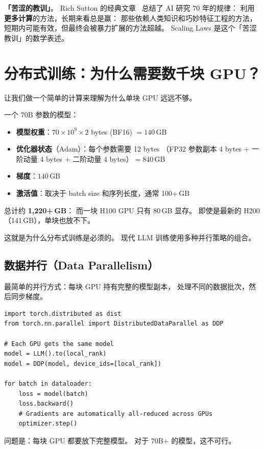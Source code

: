 \textbf{「苦涩的教训」}。
Rich Sutton 的经典文章~\cite{sutton2019bitterlesson}
总结了 AI 研究 70 年的规律：
利用\textbf{更多计算}的方法，长期来看总是赢：
那些依赖人类知识和巧妙特征工程的方法，
短期内可能有效，但最终会被暴力扩展的方法超越。
Scaling Laws 是这个「苦涩教训」的数学表述。

\section{分布式训练：为什么需要数千块 GPU？}

让我们做一个简单的计算来理解为什么单块 GPU 远远不够。

一个 70B 参数的模型：
\begin{itemize}[noitemsep]
  \item \textbf{模型权重}：$70 \times 10^9 \times 2$ bytes (BF16) $= 140$\,GB
  \item \textbf{优化器状态}（Adam）：每个参数需要 12 bytes
        （FP32 参数副本 4 bytes + 一阶动量 4 bytes + 二阶动量 4 bytes）$= 840$\,GB
  \item \textbf{梯度}：$140$\,GB
  \item \textbf{激活值}：取决于 batch size 和序列长度，通常 100+\,GB
\end{itemize}
总计约 \textbf{1,220+\,GB}：
而一块 H100 GPU 只有 80\,GB 显存。
即使是最新的 H200（141\,GB），单块也放不下。

这就是为什么分布式训练是必须的。
现代 LLM 训练使用多种并行策略的组合。

\subsection{数据并行（Data Parallelism）}

最简单的并行方式：每块 GPU 持有完整的模型副本，
处理不同的数据批次，然后同步梯度。

\begin{lstlisting}[caption={Distributed Data Parallel in PyTorch}]
import torch.distributed as dist
from torch.nn.parallel import DistributedDataParallel as DDP

# Each GPU gets the same model
model = LLM().to(local_rank)
model = DDP(model, device_ids=[local_rank])

for batch in dataloader:
    loss = model(batch)
    loss.backward()
    # Gradients are automatically all-reduced across GPUs
    optimizer.step()
\end{lstlisting}

问题是：每块 GPU 都要放下完整模型。
对于 70B+ 的模型，这不可行。

